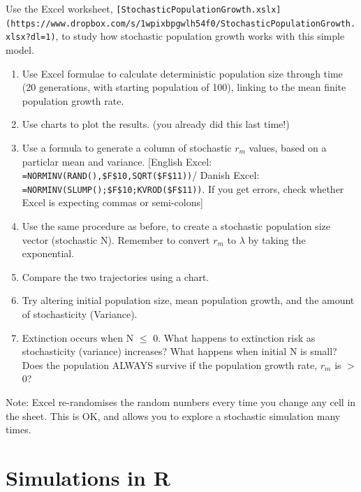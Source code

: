 \documentclass[
  a4paper]{book}
\providecommand{\tightlist}{%
  \setlength{\itemsep}{0pt}\setlength{\parskip}{0pt}}
\begin{document}
\begin{do-something}
Use the Excel worksheet,
\texttt{{[}StochasticPopulationGrowth.xslx{]}(https://www.dropbox.com/s/1wpixbpgwlh54f0/StochasticPopulationGrowth.xlsx?dl=1)},
to study how stochastic population growth works with this simple model.
\end{do-something}

\begin{enumerate}
\def\labelenumi{\arabic{enumi})}
\tightlist
\item
  Use Excel formulae to calculate deterministic population size through time (20 generations, with starting population of 100), linking to the mean finite population growth rate.
\item
  Use charts to plot the results. (you already did this last time!)
\item
  Use a formula to generate a column of stochastic \(r_m\) values, based on a particlar mean and variance. {[}English Excel: \texttt{=NORMINV(RAND(),\$F\$10,SQRT(\$F\$11))}/ Danish Excel: \texttt{=NORMINV(SLUMP();\$F\$10;KVROD(\$F\$11))}. If you get errors, check whether Excel is expecting commas or semi-colons{]}
\item
  Use the same procedure as before, to create a stochastic population size vector (stochastic N). Remember to convert \(r_m\) to \(\lambda\) by taking the exponential.
\item
  Compare the two trajectories using a chart.
\item
  Try altering initial population size, mean population growth, and the amount of stochasticity (Variance).
\item
  Extinction occurs when N \(\leq\) 0. What happens to extinction risk as stochasticity (variance) increases? What happens when initial N is small? Does the population ALWAYS survive if the population growth rate, \(r_m\) is \(>\) 0?
\end{enumerate}

\begin{do-something}
Note: Excel re-randomises the random numbers every time you change any
cell in the sheet. This is OK, and allows you to explore a stochastic
simulation many times.
\end{do-something}

\section{Simulations in R}\label{simulations-in-r}
\end{document}
